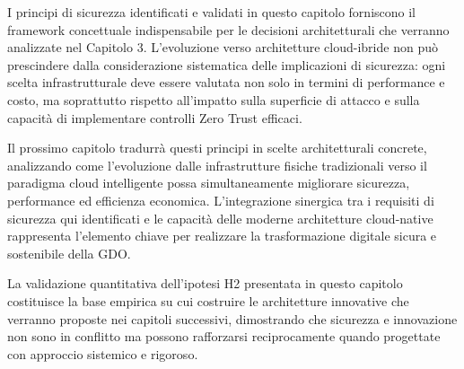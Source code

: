 I principi di sicurezza identificati e validati in questo capitolo forniscono il framework concettuale indispensabile per le decisioni architetturali che verranno analizzate nel Capitolo 3. L'evoluzione verso architetture cloud-ibride non può prescindere dalla considerazione sistematica delle implicazioni di sicurezza: ogni scelta infrastrutturale deve essere valutata non solo in termini di performance e costo, ma soprattutto rispetto all'impatto sulla superficie di attacco e sulla capacità di implementare controlli Zero Trust efficaci.

Il prossimo capitolo tradurrà questi principi in scelte architetturali concrete, analizzando come l'evoluzione dalle infrastrutture fisiche tradizionali verso il paradigma cloud intelligente possa simultaneamente migliorare sicurezza, performance ed efficienza economica. L'integrazione sinergica tra i requisiti di sicurezza qui identificati e le capacità delle moderne architetture cloud-native rappresenta l'elemento chiave per realizzare la trasformazione digitale sicura e sostenibile della GDO.

La validazione quantitativa dell'ipotesi H2 presentata in questo capitolo costituisce la base empirica su cui costruire le architetture innovative che verranno proposte nei capitoli successivi, dimostrando che sicurezza e innovazione non sono in conflitto ma possono rafforzarsi reciprocamente quando progettate con approccio sistemico e rigoroso.

